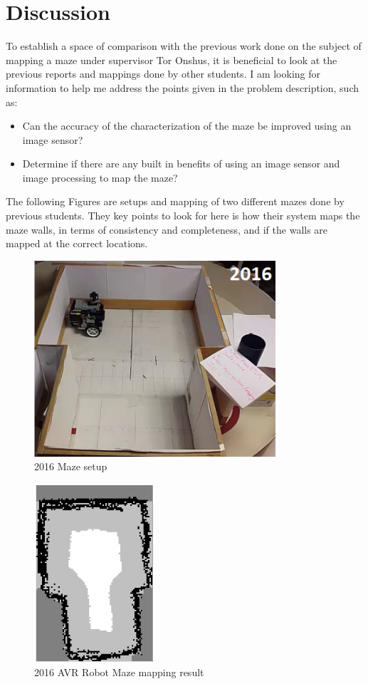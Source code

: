 \section{Discussion}
To establish a space of comparison with the previous work done on the subject of mapping a maze under supervisor Tor Onshus, it is beneficial to look at the previous reports and mappings done by other students. I am looking for information to help me address the points given in the problem description, such as:
\begin{itemize}
\item Can the accuracy of the characterization of the maze be improved using an image sensor?
\item Determine if there are any built in benefits of using an image sensor and image processing to map the maze?
\end{itemize}
The following Figures are setups and mapping of two different mazes done by previous students. They key points to look for here is how their system maps the maze walls, in terms of consistency and completeness, and if the walls are mapped at the correct locations.

\begin{figure}[H]
\centering
\includegraphics[width=0.8\textwidth]{fig/previous2}
  \caption{2016 Maze setup}
  \label{fig:previous2}
\end{figure}
\begin{figure}[H]
\centering
\includegraphics[width=0.4\textwidth]{fig/previous1}
  \caption{2016 AVR Robot Maze mapping result}
  \label{fig:previous1}
\end{figure}

